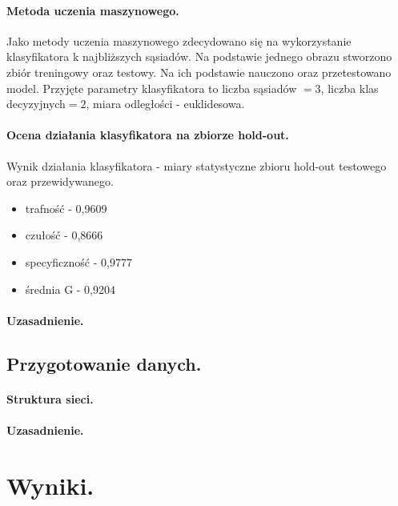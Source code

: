 \documentclass[a4paper, 11pt]{article}
\begin{document}
\paragraph{Metoda uczenia maszynowego.}

Jako metody uczenia maszynowego zdecydowano się na wykorzystanie klasyfikatora k najbliższych sąsiadów. Na podstawie jednego obrazu stworzono zbiór treningowy oraz testowy. Na ich podstawie nauczono oraz przetestowano model. Przyjęte parametry klasyfikatora to liczba sąsiadów $= 3$, liczba klas decyzyjnych$ = 2$, miara odległości - euklidesowa.

\paragraph{Ocena działania klasyfikatora na zbiorze hold-out.}

Wynik działania klasyfikatora - miary statystyczne zbioru hold-out testowego oraz przewidywanego.

\begin{itemize}
	\item trafność - 0,9609
	\item czułość - 0,8666
	\item specyficzność - 0,9777
	\item średnia G - 0,9204
\end{itemize}


\paragraph{Uzasadnienie.}
\subsection{Przygotowanie danych.}
\paragraph{Struktura sieci.}
\paragraph{Uzasadnienie.}

\section{Wyniki.}
\end{document}
